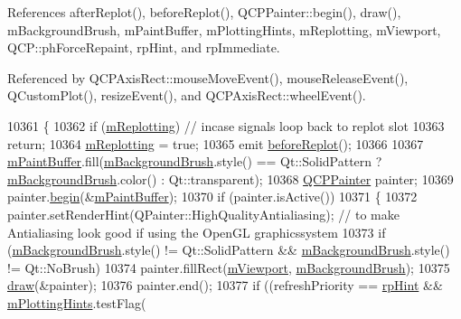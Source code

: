 References after\+Replot(), before\+Replot(), Q\+C\+P\+Painter\+::begin(), draw(), m\+Background\+Brush, m\+Paint\+Buffer, m\+Plotting\+Hints, m\+Replotting, m\+Viewport, Q\+C\+P\+::ph\+Force\+Repaint, rp\+Hint, and rp\+Immediate.



Referenced by Q\+C\+P\+Axis\+Rect\+::mouse\+Move\+Event(), mouse\+Release\+Event(), Q\+Custom\+Plot(), resize\+Event(), and Q\+C\+P\+Axis\+Rect\+::wheel\+Event().


\begin{DoxyCode}
10361 \{
10362   \textcolor{keywordflow}{if} (\hyperlink{class_q_custom_plot_ab30daeca6612c3948afd368dce5f1c39}{mReplotting}) \textcolor{comment}{// incase signals loop back to replot slot}
10363     \textcolor{keywordflow}{return};
10364   \hyperlink{class_q_custom_plot_ab30daeca6612c3948afd368dce5f1c39}{mReplotting} = \textcolor{keyword}{true};
10365   emit \hyperlink{class_q_custom_plot_a0cd30e29b73efd6afe096e44bc5956f5}{beforeReplot}();
10366   
10367   \hyperlink{class_q_custom_plot_a753630df96e0672098d9e88bd41d1913}{mPaintBuffer}.fill(\hyperlink{class_q_custom_plot_a3aef5de4ac012178e3293248e9c63737}{mBackgroundBrush}.style() == Qt::SolidPattern ? 
      \hyperlink{class_q_custom_plot_a3aef5de4ac012178e3293248e9c63737}{mBackgroundBrush}.color() : Qt::transparent);
10368   \hyperlink{class_q_c_p_painter}{QCPPainter} painter;
10369   painter.\hyperlink{class_q_c_p_painter_a0a41146ccd619dceab6e25ec7b46b044}{begin}(&\hyperlink{class_q_custom_plot_a753630df96e0672098d9e88bd41d1913}{mPaintBuffer});
10370   \textcolor{keywordflow}{if} (painter.isActive())
10371   \{
10372     painter.setRenderHint(QPainter::HighQualityAntialiasing); \textcolor{comment}{// to make Antialiasing look good if using
       the OpenGL graphicssystem}
10373     \textcolor{keywordflow}{if} (\hyperlink{class_q_custom_plot_a3aef5de4ac012178e3293248e9c63737}{mBackgroundBrush}.style() != Qt::SolidPattern && 
      \hyperlink{class_q_custom_plot_a3aef5de4ac012178e3293248e9c63737}{mBackgroundBrush}.style() != Qt::NoBrush)
10374       painter.fillRect(\hyperlink{class_q_custom_plot_ac0a7c38a715526c257cff95774f83ab6}{mViewport}, \hyperlink{class_q_custom_plot_a3aef5de4ac012178e3293248e9c63737}{mBackgroundBrush});
10375     \hyperlink{class_q_custom_plot_ad7a7d878bf050f101a43008e7d8fdb52}{draw}(&painter);
10376     painter.end();
10377     \textcolor{keywordflow}{if} ((refreshPriority == \hyperlink{class_q_custom_plot_a45d61392d13042e712a956d27762aa39adfa1f2387617168d9299f4c8ad15b332}{rpHint} && \hyperlink{class_q_custom_plot_aa184197a6101a9cc5807469e1d006c9e}{mPlottingHints}.testFlag(

\end{DoxyCode}
